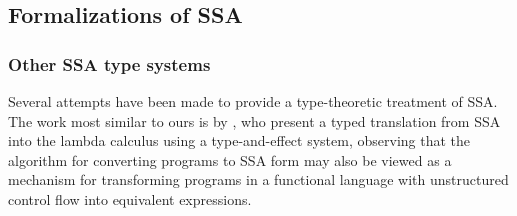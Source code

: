 \documentclass[acmsmall,screen,review]{acmart}
\begin{document}

\subsection{Formalizations of SSA}

\subsubsection{Other SSA type systems}

Several attempts have been made to provide a type-theoretic treatment of SSA. The work most similar
to ours is by \citet{typed-effect-ssa-rigon-torrens-vasconcellos-20}, who present a typed
translation from SSA into the lambda calculus using a type-and-effect system, observing that the
algorithm for converting programs to SSA form may also be viewed as a mechanism for transforming
programs in a functional language with unstructured control flow into equivalent expressions.
\end{document}
